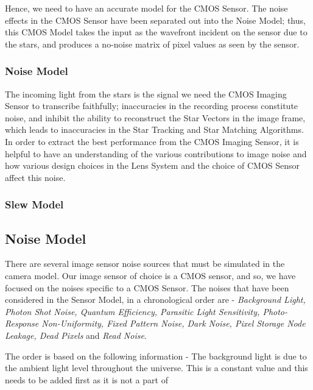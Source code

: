 \documentclass[../../main.tex]{subfiles}
\begin{document}
Hence, we need to have an accurate model for the CMOS Sensor. The noise effects in the CMOS Sensor have been separated out into the Noise Model; thus, this CMOS Model takes the input as the wavefront incident on the sensor due to the stars, and produces a no-noise matrix of pixel values as seen by the sensor. 

\subsubsection{Noise Model} %
The incoming light from the stars is the signal we need the CMOS Imaging Sensor to transcribe faithfully; inaccuracies in the recording process constitute noise, and inhibit the ability to reconstruct the Star Vectors in the image frame, which leads to inaccuracies in the Star Tracking and Star Matching Algorithms. In order to extract the best performance from the CMOS Imaging Sensor, it is helpful to have an understanding of the various contributions to image noise and how various design choices in the Lens System and the choice of CMOS Sensor affect this noise.


\subsubsection{Slew Model} %
\blindtext




\subsection{Noise Model}
There are several image sensor noise sources that must be simulated in the camera model. Our image sensor of choice is a CMOS sensor, and so, we have focused on the noises specific to a CMOS Sensor. The noises that have been considered in the Sensor Model, in a chronological order are - \emph{Background Light, Photon Shot Noise, Quantum Efficiency, Parasitic Light Sensitivity, Photo-Response Non-Uniformity, Fixed Pattern Noise, Dark Noise, Pixel Storage Node Leakage, Dead Pixels} and \emph{Read Noise}.

The order is based on the following information - 
The background light is due to the ambient light level throughout the universe. This is a constant value and this needs to be added first as it is not a part of 
\end{document}
